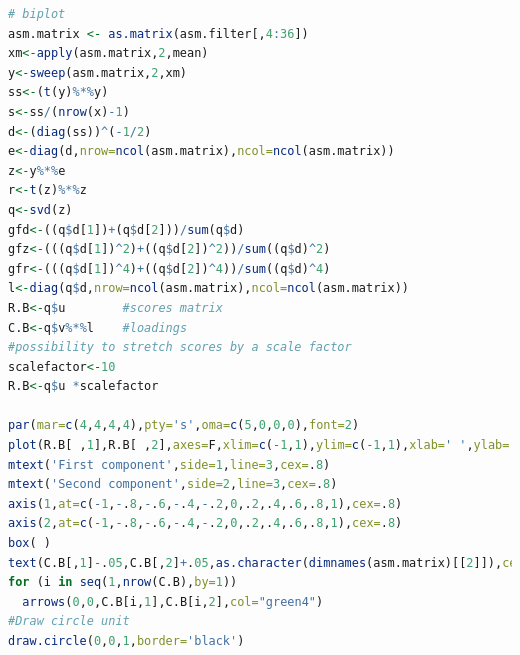 \documentclass[11pt, a4paper,titlepage]{article}
\begin{document}
\begin{lstlisting}[language=R]
# biplot
asm.matrix <- as.matrix(asm.filter[,4:36])
xm<-apply(asm.matrix,2,mean)
y<-sweep(asm.matrix,2,xm)
ss<-(t(y)%*%y)
s<-ss/(nrow(x)-1)
d<-(diag(ss))^(-1/2)
e<-diag(d,nrow=ncol(asm.matrix),ncol=ncol(asm.matrix))
z<-y%*%e
r<-t(z)%*%z
q<-svd(z)
gfd<-((q$d[1])+(q$d[2]))/sum(q$d)
gfz<-(((q$d[1])^2)+((q$d[2])^2))/sum((q$d)^2)
gfr<-(((q$d[1])^4)+((q$d[2])^4))/sum((q$d)^4)
l<-diag(q$d,nrow=ncol(asm.matrix),ncol=ncol(asm.matrix))
R.B<-q$u        #scores matrix
C.B<-q$v%*%l    #loadings
#possibility to stretch scores by a scale factor
scalefactor<-10
R.B<-q$u *scalefactor

par(mar=c(4,4,4,4),pty='s',oma=c(5,0,0,0),font=2)
plot(R.B[ ,1],R.B[ ,2],axes=F,xlim=c(-1,1),ylim=c(-1,1),xlab=' ',ylab=' ',cex=2.8, pch=".", col="grey")
mtext('First component',side=1,line=3,cex=.8)
mtext('Second component',side=2,line=3,cex=.8)
axis(1,at=c(-1,-.8,-.6,-.4,-.2,0,.2,.4,.6,.8,1),cex=.8)
axis(2,at=c(-1,-.8,-.6,-.4,-.2,0,.2,.4,.6,.8,1),cex=.8)
box( )
text(C.B[,1]-.05,C.B[,2]+.05,as.character(dimnames(asm.matrix)[[2]]),cex=0.7,col="green4")
for (i in seq(1,nrow(C.B),by=1))
  arrows(0,0,C.B[i,1],C.B[i,2],col="green4")
#Draw circle unit
draw.circle(0,0,1,border='black')
\end{lstlisting}



\end{document}
